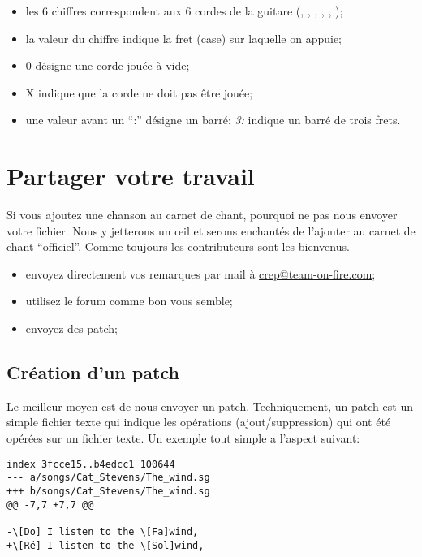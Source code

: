 \documentclass[versionenligne]{framabook}
\begin{document}
\begin{itemize}
\item les 6 chiffres correspondent aux 6 cordes de la
  guitare (, , , , , );
\item la valeur du chiffre indique la fret (case) sur laquelle on
  appuie;
\item 0 désigne une corde jouée à vide;
\item X indique que la corde ne doit pas être jouée;
\item une valeur avant un ``:'' désigne un barré: \emph{3:} indique
  un barré de trois frets.
\end{itemize}


\section{Partager votre travail}

Si vous ajoutez une chanson au carnet de chant, pourquoi ne pas nous
envoyer votre fichier. Nous y jetterons un \oe{}il et serons enchantés
de l'ajouter au carnet de chant ``officiel''. Comme toujours les
contributeurs sont les bienvenus.

\begin{itemize}
\item envoyez directement vos remarques par mail à
  \url{crep@team-on-fire.com};
\item utilisez le forum comme bon vous semble;
\item envoyez des patch;
\end{itemize}

\subsection{Création d'un patch}

Le meilleur moyen est de nous envoyer un patch. Techniquement, un
patch est un simple fichier texte qui indique les opérations
(ajout/suppression) qui ont été opérées sur un fichier texte. Un
exemple tout simple a l'aspect suivant:

\begin{verbatim}
index 3fcce15..b4edcc1 100644
--- a/songs/Cat_Stevens/The_wind.sg
+++ b/songs/Cat_Stevens/The_wind.sg
@@ -7,7 +7,7 @@

-\[Do] I listen to the \[Fa]wind,
+\[Ré] I listen to the \[Sol]wind,
\end{verbatim}
\end{document}
